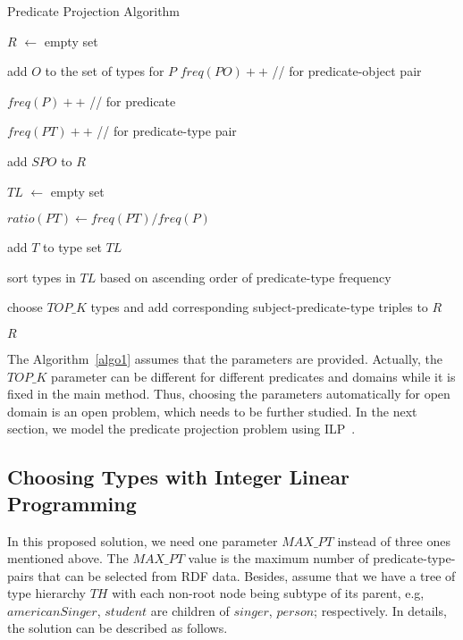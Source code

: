 \documentclass{acm_proc_article-sp}
\begin{document}
\begin{algorithm}
\label{algo1}
\caption{Predicate Projection Algorithm}

\SetAlgoLined
{}
$R$ $\leftarrow$ empty set

 {
	 {
		add $O$ to the set of types for $P$
	}
	$freq(PO)++$  //  for predicate-object pair

	$freq(P)++$  //  for predicate
}

 {
	 {
		$freq(PT)++$  //  for predicate-type pair
	}
}

 {
	 {
		add $SPO$ to $R$
	}
}
 {

	$TL$ $\leftarrow$ empty set

	 {
		$ratio(PT) \leftarrow freq(PT) / freq(P)$

		 {
			add $T$ to type set $TL$
		}
	}
	sort types in $TL$ based on ascending order of predicate-type frequency

	choose $TOP\_K$ types and add corresponding subject-predicate-type triples to $R$

}

\Return $R$

\end{algorithm}

The Algorithm~\ref{algo1} assumes that the parameters are provided. Actually, the $TOP\_K$ parameter can be different for different predicates and domains while it is fixed in the main method. Thus, choosing the parameters automatically for open domain is an open problem, which needs to be further studied. In the next section, we model the predicate projection problem using ILP~\cite{ref1}.

\subsection{Choosing Types with Integer Linear Programming}

In this proposed solution, we need one parameter $MAX\_PT$ instead of three ones mentioned above. The $MAX\_PT$ value is the maximum number of predicate-type-pairs that can be selected from RDF data. Besides, assume that we have a tree of type hierarchy $TH$ with each non-root node being subtype of its parent, e.g, $americanSinger$, $student$ are children of $singer$, $person$; respectively. In details, the solution can be described as follows.
\end{document}
